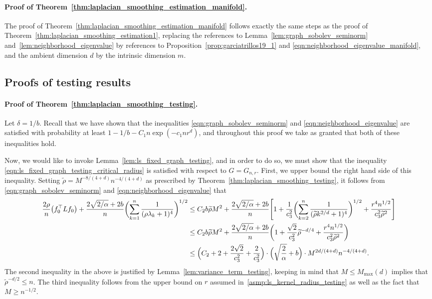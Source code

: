 \documentclass[twoside]{article}
\newcommand{\1}{\mathbf{1}}
\newcommand{\Lap}{L}
\newcommand{\wt}[1]{\widetilde{#1}}
\theoremstyle{definition}
\theoremstyle{remark}
\begin{document}
\paragraph{Proof of Theorem~\ref{thm:laplacian_smoothing_estimation_manifold}.}
The proof of Theorem~\ref{thm:laplacian_smoothing_estimation_manifold} follows exactly the same steps as the proof of Theorem~\ref{thm:laplacian_smoothing_estimation1}, replacing the references to Lemma~\ref{lem:graph_sobolev_seminorm} and~\ref{lem:neighborhood_eigenvalue} by references to Proposition~\ref{prop:garciatrillos19_1} and \eqref{eqn:neighborhood_eigenvalue_manifold}, and the ambient dimension $d$ by the intrinsic dimension $m$. 

\subsection{Proofs of testing results}
\label{subsec:laplacian_smoothing_testing_pf}

\paragraph{Proof of Theorem~\ref{thm:laplacian_smoothing_testing}.}
Let $\delta = 1/b$. Recall that we have shown that the inequalities \eqref{eqn:graph_sobolev_seminorm} and \eqref{eqn:neighborhood_eigenvalue} are satisfied with probability at least $1 - 1/b - C_1n\exp(-c_1nr^d)$, and throughout this proof we take as granted that both of these inequalities hold. 

Now, we would like to invoke Lemma~\ref{lem:ls_fixed_graph_testing}, and in order to do so, we must show that the inequality \eqref{eqn:ls_fixed_graph_testing_critical_radius} is satisfied with respect to $G = G_{n,r}$. First, we upper bound the right hand side of this inequality. Setting $\wt{\rho} = M^{-8/(4 + d)}n^{-4/(4 + d)}$ as prescribed by Theorem~\ref{thm:laplacian_smoothing_testing}, it follows from \eqref{eqn:graph_sobolev_seminorm} and \eqref{eqn:neighborhood_eigenvalue} that
\begin{align*}
\frac{2 \rho}{n} \bigl(f_0^{\top} \Lap f_0\bigr) + \frac{2\sqrt{2/\alpha} + 2b}{n} \biggl(\sum_{k = 1}^{n} \frac{1}{(\rho\lambda_k + 1)^4} \biggr)^{1/2} & \leq C_2b\wt{\rho}M^2 + \frac{2\sqrt{2/\alpha} + 2b}{n}\Biggl[1 + \frac{1}{c_3^2}\biggl(\sum_{k = 2}^{n} \frac{1}{(\wt{\rho}k^{2/d} + 1)^4} \biggr)^{1/2} + \frac{r^4n^{1/2}}{c_3^2\wt{\rho}^2}\Biggr] \\
& \leq C_2b\wt{\rho}M^2 + \frac{2\sqrt{2/\alpha} + 2b}{n}\biggl(1 + \frac{\sqrt{2}}{c_3^{2}}\wt{\rho}^{-d/4} + \frac{r^4n^{1/2}}{c_3^2\wt{\rho}^2}\biggr) \\ 
& \leq \Bigl(C_2 + 2 + \frac{2\sqrt{2}}{c_3^{2}} + \frac{2}{c_3^2}\Bigr)\cdot \Bigl(\sqrt{\frac{2}{\alpha}} + b\Bigr) \cdot M^{2d/(4 + d)} n^{-4/(4 + d)}.
\end{align*}
The second inequality in the above is justified by Lemma~\ref{lem:variance_term_testing}, keeping in mind that $M \leq M_{\max}(d)$ implies that $\wt{\rho}^{-d/2} \leq n$. The third inequality follows from the upper bound on $r$ assumed in~\ref{asmp:ls_kernel_radius_testing} as well as the fact that $M \geq n^{-1/2}$.
\end{document}
